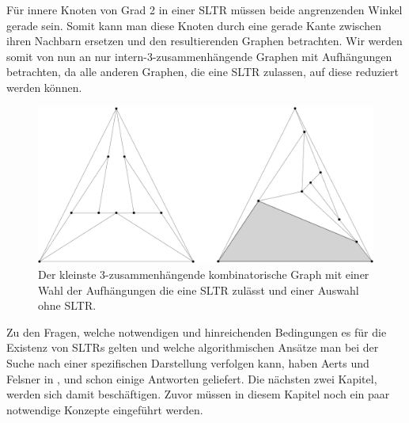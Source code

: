 \begin{remark}
Für innere Knoten von Grad 2 in einer SLTR müssen beide angrenzenden Winkel gerade sein. Somit kann man diese Knoten durch eine gerade Kante zwischen ihren Nachbarn ersetzen und den resultierenden Graphen betrachten. Wir werden somit von nun an nur intern-3-zusammenhängende Graphen mit Aufhängungen betrachten, da alle anderen Graphen, die eine SLTR zulassen, auf diese reduziert werden können.
\end{remark}

\begin{figure}[h]
	\centering
  \includegraphics[scale=0.1]{10_example.png}
	\caption{Der kleinste 3-zusammenhängende kombinatorische Graph mit einer Wahl der Aufhängungen die eine SLTR zulässt und einer Auswahl ohne SLTR.}
	\label{10_example}
\end{figure}

Zu den Fragen, welche notwendigen und hinreichenden Bedingungen es für die Existenz von SLTRs gelten und  welche algorithmischen Ansätze man bei der Suche nach einer spezifischen Darstellung verfolgen kann, haben Aerts und Felsner in \cite{af13}, \cite{af13h} und \cite{af15} schon einige Antworten geliefert. Die nächsten zwei Kapitel, werden sich damit beschäftigen. Zuvor müssen in diesem Kapitel noch ein paar notwendige Konzepte eingeführt werden.
